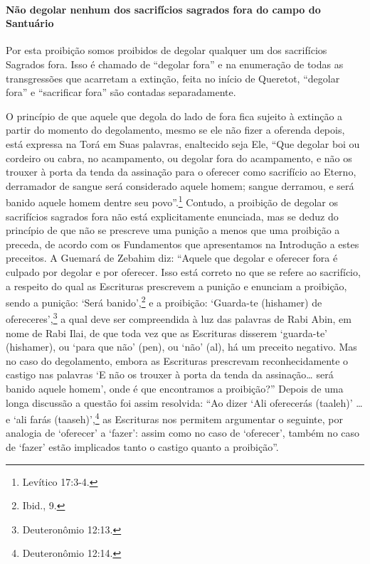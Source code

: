 \paragraph{Não degolar nenhum dos sacrifícios sagrados fora do campo do Santuário}

Por esta proibição somos proibidos de degolar qualquer um dos
sacrifícios Sagrados fora. Isso é chamado de ``degolar fora'' e na
enumeração de todas as transgressões que acarretam a extinção, feita no
início de Queretot, ``degolar fora'' e ``sacrificar fora'' são contadas
separadamente.

O princípio de que aquele que degola do lado de fora fica sujeito à
extinção a partir do momento do degolamento, mesmo se ele não fizer a
oferenda depois, está expressa na Torá em Suas palavras, enaltecido
seja Ele, ``Que degolar boi ou cordeiro ou cabra, no acampamento, ou
degolar fora do acampamento, e não os trouxer à porta da tenda da
assinação para o oferecer como sacrifício ao Eterno, derramador de
sangue será considerado aquele homem; sangue derramou, e será banido
aquele homem dentre seu povo''.\footnote{Levítico 17:3-4.} Contudo, a proibição
de degolar os sacrifícios sagrados fora não está explicitamente
enunciada, mas se deduz do princípio de que não se prescreve uma
punição a menos que uma proibição a preceda, de acordo com os
Fundamentos que apresentamos na Introdução a estes preceitos. A Guemará
de Zebahim diz: ``Aquele que degolar e oferecer fora é culpado por
degolar e por oferecer. Isso está correto no que se refere ao
sacrifício, a respeito do qual as Escrituras prescrevem a punição e enunciam a proibição, sendo a punição: `Será banido',\footnote{Ibid., 9.}
e a proibição: `Guarda-te (hishamer) de ofereceres',\footnote{Deuteronômio
12:13.} a qual deve ser compreendida à luz das palavras de Rabi Abin, em
nome de Rabi Ilai, de que toda vez que as Escrituras disserem
`guarda-te' (hishamer), ou `para que não' (pen), ou `não' (al), há um
preceito negativo. Mas no caso do degolamento, embora as Escrituras
prescrevam reconhecidamente o castigo nas palavras `E não os trouxer à
porta da tenda da assinação\ldots{} será banido aquele homem', onde é que
encontramos a proibição?'' Depois de uma longa discussão a questão foi
assim resolvida: ``Ao dizer `Ali oferecerás (taaleh)' \ldots{} e `ali farás
(taaseh)',\footnote{Deuteronômio 12:14.} as Escrituras nos permitem argumentar o
seguinte, por analogia de `oferecer' a `fazer': assim como no caso de
`oferecer', também no caso de `fazer' estão implicados tanto o castigo
quanto a proibição''.

